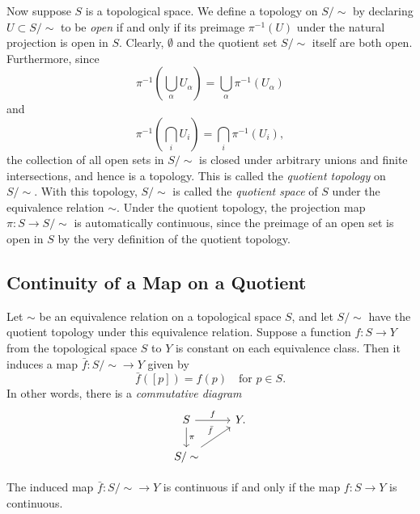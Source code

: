 Now suppose $S$ is a topological space. We define a topology on $S/\sim$ by
declaring $U\subset S/\sim$ to be \emph{open} if and only if its preimage
$\pi^{-1}(U)$ under the natural projection is open in $S$. Clearly,
$\emptyset$ and the quotient set $S/\sim$ itself are both open. Furthermore,
since
\begin{displaymath}
	\pi^{-1}\left(\bigcup_\alpha U_\alpha\right) = \bigcup_{\alpha}\pi^{-1}(U_\alpha)
\end{displaymath}
and
\begin{displaymath}
	\pi^{-1}\left(\bigcap_i U_i\right) =\bigcap_i \pi^{-1}(U_i),
\end{displaymath}
the collection of all open sets in $S/\sim$ is closed under arbitrary unions
and finite intersections, and hence is a topology. This is called the
\emph{quotient topology} on $S/\sim$. With this topology, $S/\sim$ is called
the \emph{quotient space} of $S$ under the equivalence relation $\sim$. Under
the quotient topology, the projection map $\pi:S\to S/\sim$ is automatically
continuous, since the preimage of an open set is open in $S$ by the very
definition of the quotient topology.


\subsection{Continuity of a Map on a Quotient}

Let $\sim$ be an equivalence relation on a topological space $S$, and let
$S/\sim$ have the quotient topology under this equivalence relation. Suppose a
function $f:S\to Y$ from the topological space $S$ to $Y$ is constant on each
equivalence class. Then it induces a map $\bar{f}: S/\sim \to Y$ given by
\begin{displaymath}
	\bar{f}([p]) = f(p)\quad \text{for $p\in S$}.
\end{displaymath}
In other words, there is a \emph{commutative diagram}
\begin{displaymath}
	\begin{tikzcd}
		S \arrow[r,"f"]\arrow[d,"\pi"] & Y.\\
		S/\sim \arrow[ru,"\bar{f}"]
	\end{tikzcd}
\end{displaymath}

\begin{proposition}
  \label{prop:continuous-of-quotient-map}
	The induced map $\bar{f}: S/\sim\to Y$ is continuous if and only if the
	map $f: S\to Y$ is continuous.
\end{proposition}

